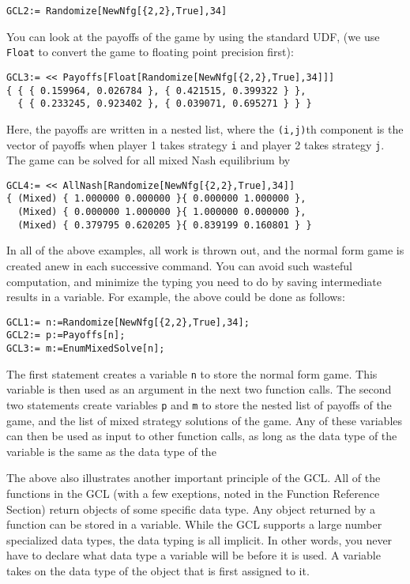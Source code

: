 \begin{verbatim}
GCL2:= Randomize[NewNfg[{2,2},True],34]
\end{verbatim}  

\noindent
You can look at the payoffs of the game by using the standard UDF,
 (we use \verb+Float+ to convert the game to floating
point precision first):

\begin{verbatim}
GCL3:= << Payoffs[Float[Randomize[NewNfg[{2,2},True],34]]]
{ { { 0.159964, 0.026784 }, { 0.421515, 0.399322 } },
  { { 0.233245, 0.923402 }, { 0.039071, 0.695271 } } }
\end{verbatim}  

\noindent
Here, the payoffs are written in a nested list, where the
\verb+(i,j)+th component is the vector of payoffs when player 1 takes
strategy \verb+i+ and player 2 takes strategy \verb+j+.  The game can
be solved for all mixed Nash equilibrium by

\begin{verbatim}
GCL4:= << AllNash[Randomize[NewNfg[{2,2},True],34]]
{ (Mixed) { 1.000000 0.000000 }{ 0.000000 1.000000 },
  (Mixed) { 0.000000 1.000000 }{ 1.000000 0.000000 },
  (Mixed) { 0.379795 0.620205 }{ 0.839199 0.160801 } }
\end{verbatim}

In all of the above examples, all work is thrown out, and the normal
form game is created anew in each successive command.  You can avoid
such wasteful computation, and minimize the typing you need to do by
saving intermediate results in a variable.  For example, the above
could be done as follows:

\begin{verbatim}
GCL1:= n:=Randomize[NewNfg[{2,2},True],34];
GCL2:= p:=Payoffs[n];
GCL3:= m:=EnumMixedSolve[n];
\end{verbatim}

The first statement creates a variable \verb+n+ to store the normal
form game.  This variable is then used as an argument in the next two
function calls.  The second two statements create variables \verb+p+
and \verb+m+ to store the nested list of payoffs of the game, and the
list of mixed strategy solutions of the game.  Any of these variables
can then be used as input to other function calls, as long as the data
type of the variable is the same as the data type of the 

The above also illustrates another important principle of the GCL.
All of the functions in the GCL (with a few exeptions, noted in the
Function Reference Section) return objects of some specific data type.
Any object returned by a function can be stored in a variable.  While
the GCL supports a large number specialized data types, the data
typing is all implicit.  In other words, you never have to declare
what data type a variable will be before it is used.  A variable takes
on the data type of the object that is first assigned to it.    

